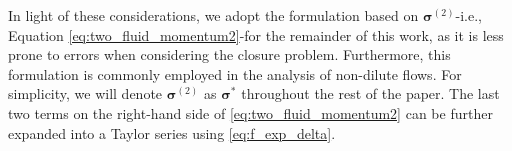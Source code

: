 In light of these considerations, we adopt the formulation based on $\bm \sigma^{(2)}$-i.e., Equation \ref{eq:two_fluid_momentum2}-for the remainder of this work, as it is less prone to errors when considering the closure problem. 
Furthermore, this formulation is commonly employed in the analysis of non-dilute flows. 
For simplicity, we will denote $\bm \sigma^{(2)}$ as $\bm \sigma^{*}$ throughout the rest of the paper.
The last two terms on the right-hand side of \ref{eq:two_fluid_momentum2} can be further expanded into a Taylor series using \ref{eq:f_exp_delta}.
